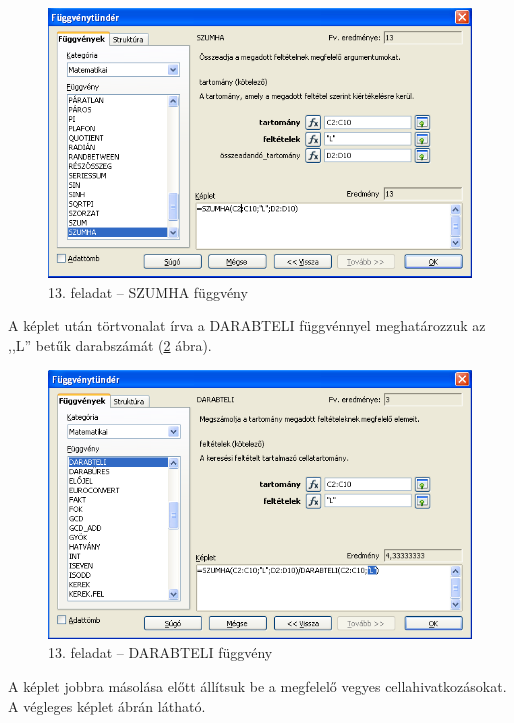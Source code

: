 \begin{figure}[!h]
\begin{center}
\includegraphics[width=13.999cm]{oocalcv2-img74.png}
\caption{13. feladat -- SZUMHA függvény}\label{13-feladatSUMIF}
\end{center}
\end{figure}

A képlet után törtvonalat írva a DARABTELI függvénnyel
meghatározzuk az ,,L'' betűk
darabszámát (\ref{13-feladatCOUNTIF} ábra).

\begin{figure}[!h]
\begin{center}
\includegraphics[width=13.999cm]{oocalcv2-img75.png}
\caption{13. feladat -- DARABTELI függvény}\label{13-feladatCOUNTIF}
\end{center}
\end{figure}

A képlet jobbra másolása előtt állítsuk be a megfelelő
vegyes cellahivatkozásokat. A végleges képlet
 ábrán látható.

